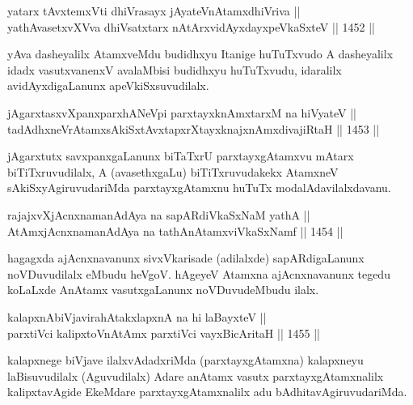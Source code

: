 
\begin{shl}
yatarx tAvxtemxVti dhiVrasayx jAyateV\s nAtamxdhiVriva || \\
yathAvasetxvXVva dhiVsatxtarx nAtArxvidAyxdayxpeVkaSxteV ||  1452 ||  
\end{shl}

\begin{artha}
yAva dasheyalilx AtamxveMdu budidhxyu Itanige huTuTxvudo A dasheyalilx idadx vasutxvanenxV avalaMbisi budidhxyu huTuTxvudu, idaralilx avidAyxdigaLanunx apeVkiSxsuvudilalx.
\end{artha}

\begin{shl}
jAgarxtasxvXpanxparxhANeV\s pi parxtayxknAmxtarxM na hiVyateV ||  \\
tadAdhxneVrAtamxsAkiSxtAvxtapxrXtayxknajxnAmxdivajiRtaH ||  1453 ||  
\end{shl}

\begin{artha}
jAgarxtutx savxpanxgaLanunx biTaTxrU parxtayxgAtamxvu mAtarx biTiTxruvudilalx, A (avasethxgaLu) biTiTxruvudakekx AtamxneV sAkiSxyAgiruvudariMda parxtayxgAtamxnu huTuTx modalAdavilalxdavanu.
\end{artha}

\begin{shl}
rajajxvXjAcnxnamanAdAya na sapARdiVkaSxNaM yathA || \\
AtAmxjAcnxnamanAdAya na tathA\s nAtamxviVkaSxNamf ||  1454 ||  
\end{shl}

\begin{artha}
hagagxda ajAcnxnavanunx sivxVkarisade (adilalxde) sapARdigaLanunx noVDuvudilalx eMbudu heVgoV. hAgeyeV Atamxna ajAcnxnavanunx tegedu koLaLxde AnAtamx vasutxgaLanunx noVDuvudeMbudu ilalx.
\end{artha}


\begin{shl}
kalapxnAbiVjavirahAtakxlapxnA na hi laBayxteV ||  \\
parxtiVci kalipxtoV\s nAtAmx parxtiVci vayxBicAritaH ||  1455 ||  
\end{shl}

\begin{artha}
kalapxnege biVjave ilalxvAdadxriMda (parxtayxgAtamxna) kalapxneyu laBisuvudilalx (Aguvudilalx) Adare anAtamx vasutx parxtayxgAtamxnalilx kalipxtavAgide EkeMdare parxtayxgAtamxnalilx adu bAdhitavAgiruvudariMda.
\end{artha}

